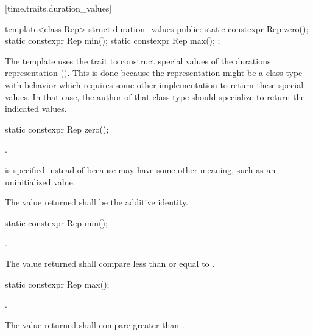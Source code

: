 [time.traits.duration_values]{}

%
\begin{itemdecl}
template<class Rep>
  struct duration_values {
  public:
    static constexpr Rep zero();
    static constexpr Rep min();
    static constexpr Rep max();
};
\end{itemdecl}

\pnum
The  template uses the  trait to
construct special values of the durations representation (). This is
done because the representation might be a class type with behavior which
requires some other implementation to return these special values. In that case,
the author of that class type should specialize  to
return the indicated values.

%
\begin{itemdecl}
static constexpr Rep zero();
\end{itemdecl}

\begin{itemdescr}
\pnum
\returns {}. \begin{note}  is specified instead of
 because  may have some other meaning, such as an
uninitialized value. \end{note}

\pnum
\remarks The value returned shall be the additive identity.
\end{itemdescr}

%
\begin{itemdecl}
static constexpr Rep min();
\end{itemdecl}

\begin{itemdescr}
\pnum
\returns {}.

\pnum
\remarks The value returned shall compare less than or equal to .
\end{itemdescr}

%
\begin{itemdecl}
static constexpr Rep max();
\end{itemdecl}

\begin{itemdescr}
\pnum
\returns {}.

\pnum
\remarks The value returned shall compare greater than .
\end{itemdescr}

